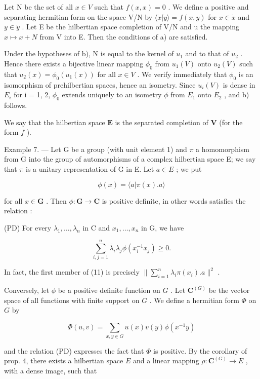 Let N be the set of all \(x \in V\) such that \(f(x, x) = 0\) . We define a positive and separating hermitian form on the space V/N by \(\langle \dot{x} | \dot{y} \rangle = f(x, y)\) for \(x \in \dot{x}\) and \(y \in \dot{y}\) . Let E be the hilbertian space completion of V/N and u the mapping \(x \mapsto x + N\) from V into E. Then the conditions of a) are satisfied.

Under the hypotheses of b), N is equal to the kernel of \(u_{1}\) and to that of \(u_{2}\) . Hence there exists a bijective linear mapping \(\phi_{0}\) from \(u_{1}(V)\) onto \(u_{2}(V)\) such that \(u_{2}(x) = \phi_{0}(u_{1}(x))\) for all \(x \in V\) . We verify immediately that \(\phi_{0}\) is an isomorphism of prehilbertian spaces, hence an isometry. Since \(u_{i}(V)\) is dense in \(E_{i}\) for i = 1, 2, \(\phi_{0}\) extends uniquely to an isometry \(\phi\) from \(E_{1}\) onto \(E_{2}\) , and b) follows.

We say that the hilbertian space \(\mathbf{E}\) is the separated completion of \(\mathbf{V}\) (for the form \(f\) ).

Example 7. --- Let G be a group (with unit element 1) and \(\pi\) a homomorphism from G into the group of automorphisms of a complex hilbertian space E; we say that \(\pi\) is a unitary representation of G in E. Let \(a \in E\) ; we put

\[
\phi (x) = \langle a | \pi (x). a \rangle
\]

for all \(x \in \mathbf{G}\) . Then \(\phi : \mathbf{G} \to \mathbf{C}\) is positive definite, in other words satisfies the relation :

(PD) For every \(\lambda_{1},\ldots,\lambda_{n}\) in C and \(x_{1},\ldots,x_{n}\) in G, we have

\[
\sum_ {i, j = 1} ^ {n} \overline {{\lambda}} _ {i} \lambda_ {j} \phi (x _ {i} ^ {- 1} x _ {j}) \geqslant 0.\tag{11}
\]

In fact, the first member of (11) is precisely \(\| \sum_{i=1}^{n} \lambda_i \pi(x_i). a \|^2\) .

Conversely, let \(\phi\) be a positive definite function on \(G\) . Let \(\mathbf{C}^{(G)}\) be the vector space of all functions with finite support on \(G\) . We define a hermitian form \(\Phi\) on \(G\) by

\[
\Phi (u, v) = \sum_ {x, y \in G} \overline {{u (x)}} v (y) \phi (x ^ {- 1} y)\tag{12}
\]

and the relation (PD) expresses the fact that \(\Phi\) is positive. By the corollary of prop. 4, there exists a hilbertian space \(E\) and a linear mapping \(\rho : \mathbf{C}^{(G)} \to E\) , with a dense image, such that

